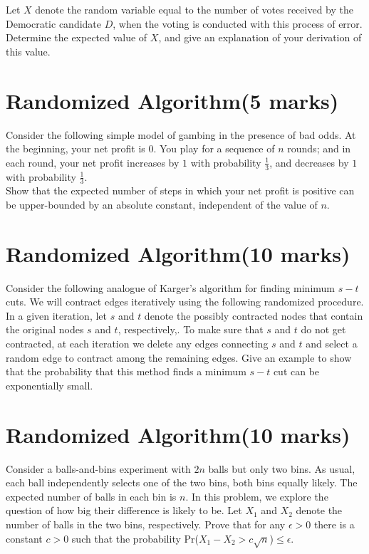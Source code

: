 \documentclass[a4paper,11pt]{article}
\begin{document}
		 Let $X$ denote the random variable equal to the number of votes received by the Democratic candidate $D$, when the voting is conducted with this process of error. Determine the expected value of $X$, and give an explanation of your derivation of this value.

\section{Randomized Algorithm(5 marks)}

Consider the following simple model of gambing in the presence of bad odds. At the beginning, your net profit is $0$. You play for a sequence of $n$ rounds; and in each round, your net profit increases by $1$ with probability $\frac{1}{3}$, and decreases by $1$ with probability $\frac{1}{3}$.\\

		 Show that the expected number of steps in which your net profit is positive can be upper-bounded by an absolute constant, independent of the value of $n$.

\section{Randomized Algorithm(10 marks)}

Consider the following analogue of Karger's algorithm for finding minimum $s-t$ cuts. We will contract edges iteratively using the following randomized procedure. In a given iteration, let $s$ and $t$ denote the possibly contracted nodes that contain the original nodes $s$ and $t$, respectively,. To make sure that $s$ and $t$ do not get contracted, at each iteration we delete any edges connecting $s$ and $t$ and select a random edge to contract among the remaining edges. Give an example to show that the probability that this method finds a minimum $s-t$ cut can be exponentially small.

\section{Randomized Algorithm(10 marks)}

Consider a balls-and-bins experiment with $2n$ balls but only two bins. As usual, each ball independently selects one of the two bins, both bins equally likely. The expected number of balls in each bin is $n$. In this problem, we explore the question of how big their difference is likely to be. Let $X_1$ and $X_2$ denote the number of balls in the two bins, respectively. Prove that for any $\epsilon >0$ there is a constant $c>0$ such that the probability Pr($X_1-X_2>c\sqrt {n}$)$\leq \epsilon$.
\end{document}
